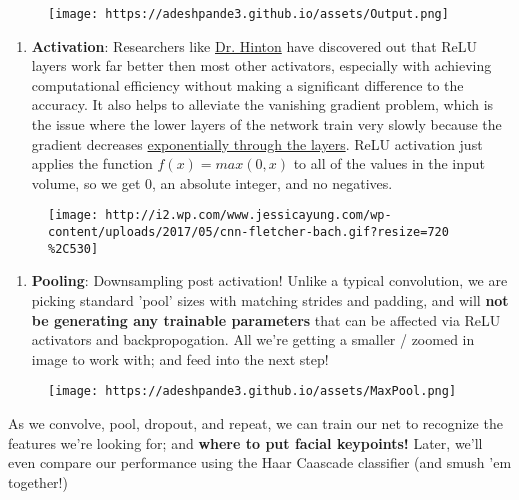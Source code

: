\documentclass[11pt]{article}
\makeatletter
\def\maxwidth{\ifdim\Gin@nat@width>\linewidth\linewidth
    \else\Gin@nat@width\fi}
\let\Oldincludegraphics\includegraphics
\renewcommand{\includegraphics}[1]{\Oldincludegraphics[width=.8\maxwidth]{#1}}
\providecommand{\tightlist}{%
      \setlength{\itemsep}{0pt}\setlength{\parskip}{0pt}}
\makeatother
\begin{document}
\begin{figure}
\centering
\texttt{[image: https://adeshpande3.github.io/assets/Output.png]}
\caption{}
\end{figure}

\begin{enumerate}
\def\labelenumi{\arabic{enumi})}
\setcounter{enumi}{3}
\tightlist
\item
  \textbf{Activation}: Researchers like
  \href{http://www.cs.toronto.edu/~fritz/absps/reluICML.pdf}{Dr. Hinton}
  have discovered out that ReLU layers work far better then most other
  activators, especially with achieving computational efficiency without
  making a significant difference to the accuracy. It also helps to
  alleviate the vanishing gradient problem, which is the issue where the
  lower layers of the network train very slowly because the gradient
  decreases
  \href{https://www.quora.com/What-is-the-vanishing-gradient-problem}{exponentially
  through the layers}. ReLU activation just applies the function
  \(f(x) = max(0, x)\) to all of the values in the input volume, so we
  get 0, an absolute integer, and no negatives.
\end{enumerate}

\begin{figure}
\centering
\texttt{[image: http://i2.wp.com/www.jessicayung.com/wp-content/uploads/2017/05/cnn-fletcher-bach.gif?resize=720\\\%2C530]}
\caption{}
\end{figure}

\begin{enumerate}
\def\labelenumi{\arabic{enumi})}
\setcounter{enumi}{4}
\tightlist
\item
  \textbf{Pooling}: Downsampling post activation! Unlike a typical
  convolution, we are picking standard 'pool' sizes with matching
  strides and padding, and will \textbf{not be generating any trainable
  parameters} that can be affected via ReLU activators and
  backpropogation. All we're getting a smaller / zoomed in image to work
  with; and feed into the next step!
\end{enumerate}

\begin{figure}
\centering
\texttt{[image: https://adeshpande3.github.io/assets/MaxPool.png]}
\caption{}
\end{figure}

As we convolve, pool, dropout, and repeat, we can train our net to
recognize the features we're looking for; and \textbf{where to put
facial keypoints!} Later, we'll even compare our performance using the
Haar Caascade classifier (and smush 'em together!)
\end{document}
